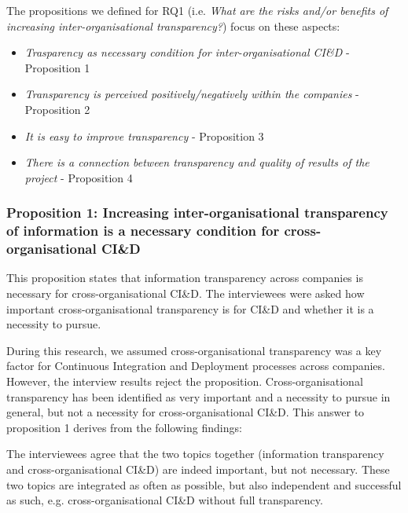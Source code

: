 The propositions we defined for  
RQ1 (i.e. {\em What are the risks and/or benefits of increasing inter-organisational transparency?}) focus on these aspects:

\begin{itemize}
\item {\em Trasparency as necessary condition for  inter-organisational CI\&D}  - Proposition 1 %
\item {\em Transparency is perceived positively/negatively within the companies} - Proposition 2 %
\item {\em It is easy to improve transparency} - Proposition 3 %
\item {\em There is a connection between transparency and quality of results of the project} - Proposition 4 %
\end{itemize}

\subsubsection{Proposition 1: Increasing inter-organisational transparency of information is a necessary condition for cross-organisational CI\&D}

This proposition states that information transparency across companies is necessary for cross-organisational CI\&D. The interviewees were asked how important cross-orga\-ni\-sa\-tional transparency is for CI\&D and whether it is a necessity to pursue. 

During this research, we assumed cross-organisational transparency was a key factor for Continuous Integration and Deployment processes across companies. However, the interview results reject the proposition. Cross-organisational transparency has been identified as very important and a necessity to pursue in general, but not a necessity for cross-organisational CI\&D. This answer to proposition 1 derives from the following findings:

 The interviewees agree that the two topics together (information transparency and cross-organisational CI\&D) are indeed important, but not necessary. These two topics are integrated as often as possible, but also independent and successful as such, e.g. cross-organisational CI\&D without full transparency.

